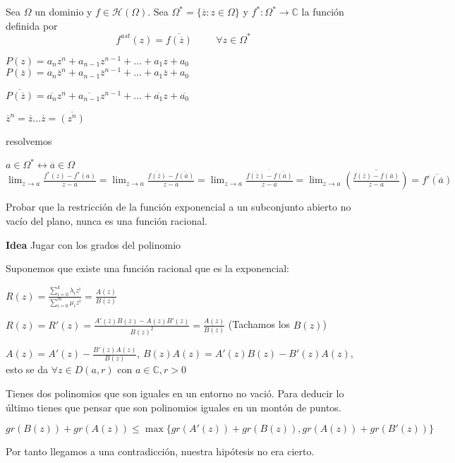 \begin{ejer}
	Sea $\Omega$ un dominio y $f\in\mathcal{H}(\Omega)$. Sea $\Omega^{\ast} = \{ \overline{z} : z\in\Omega \}$ y $f^{\ast}:\Omega^{\ast} \rightarrow \mathbb{C}$ la función definida por
	$$ f^{ast}(z) = \overline{ f(\overline{z} ) } \hspace{1cm} \forall z\in\Omega^{\ast}$$
\end{ejer}

\begin{sol}
$P(z) = a_n z^n + a_{n-1}z^{n-1}+...+a_1z + a_0$
$P(\overline{z}) = a_n \overline{z}^n + a_{n-1}\overline{z}^{n-1}+...+a_1\overline{z} + a_0 $

$\overline{ P(\overline{z}) } = \overline{a_n}z^n + \overline{a_{n-1}}z^{n-1}+...+\overline{a_1}z + \overline{a_0}$

$\overline{z}^n = \overline{z} ... \overline{z} = \overline{(z^n)}$

resolvemos

$a\in\Omega^{\ast} \longleftrightarrow \overline{a}\in\Omega$
$\lim_{z\rightarrow a} \frac{f^{\ast}(z)-f^{\ast}(a)}{z-a} = \lim_{z\rightarrow a} \frac{\overline{f(\overline{z})} - \overline{f(\overline{a})}}{z-a} =
 \lim_{z\rightarrow a} \frac{\overline{\overline{f(\overline{z})} - \overline{f(\overline{a})}}}{z-a} =
 \lim_{z\rightarrow a} \overline{\left( \frac{f(\overline{z})-f(\overline{a})}{z-a} \right)} =
 \overline{f'(\overline{a})}$
\end{sol}




\begin{ejer}
	Probar que la restricción de la función exponencial a un subconjunto abierto no vacío del plano, nunca es una función racional.
\end{ejer}

\begin{sol}

\textbf{Idea} Jugar con los grados del polinomio

Suponemos que  existe una función racional que es la exponencial:

$R(z) = \frac{\sum_{i=0}^k \lambda_i z^i}{\sum_{i=0}^m \mu_i z^i} = \frac{A(z)}{B(z)}$

$R(z) = R'(z) = \frac{A'(z)B(z)-A(z)B'(z)}{B(z)^2} = \frac{A(z)}{B(z)}$ 
(Tachamos los $B(z)$)

$A(z) = A'(z) - \frac{B'(z)A(z)}{B(z)}$,
$B(z)A(z) = A'(z)B(z) - B'(z)A(z)$, esto se da $\forall z\in D(a,r)$ con $a\in\mathbb{C}, r>0$

Tienes dos polinomios que son iguales en un entorno no vació. Para deducir lo último tienes que pensar que son polinomios iguales en un montón de puntos.


$gr(B(z)) + gr(A(z)) \leq \max \{ gr(A'(z)) + gr(B(z)), gr(A(z))+gr(B'(z)) \}$

Por tanto llegamos a una contradicción, nuestra hipótesis no era cierto.

\end{sol}